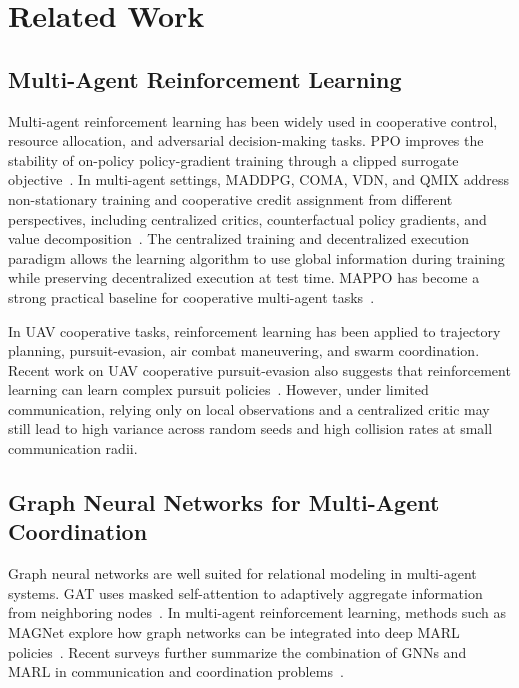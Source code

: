 \section{Related Work}

\subsection{Multi-Agent Reinforcement Learning}

Multi-agent reinforcement learning has been widely used in cooperative control, resource allocation, and adversarial decision-making tasks. PPO improves the stability of on-policy policy-gradient training through a clipped surrogate objective~\cite{schulman2017ppo}. In multi-agent settings, MADDPG, COMA, VDN, and QMIX address non-stationary training and cooperative credit assignment from different perspectives, including centralized critics, counterfactual policy gradients, and value decomposition~\cite{lowe2017maddpg,foerster2018coma,sunehag2018vdn,rashid2018qmix}. The centralized training and decentralized execution paradigm allows the learning algorithm to use global information during training while preserving decentralized execution at test time. MAPPO has become a strong practical baseline for cooperative multi-agent tasks~\cite{yu2021mappo}.

In UAV cooperative tasks, reinforcement learning has been applied to trajectory planning, pursuit-evasion, air combat maneuvering, and swarm coordination. Recent work on UAV cooperative pursuit-evasion also suggests that reinforcement learning can learn complex pursuit policies~\cite{zhao2024uav_pursuit_evasion}. However, under limited communication, relying only on local observations and a centralized critic may still lead to high variance across random seeds and high collision rates at small communication radii.

\subsection{Graph Neural Networks for Multi-Agent Coordination}

Graph neural networks are well suited for relational modeling in multi-agent systems. GAT uses masked self-attention to adaptively aggregate information from neighboring nodes~\cite{velickovic2017gat}. In multi-agent reinforcement learning, methods such as MAGNet explore how graph networks can be integrated into deep MARL policies~\cite{malysheva2020magnet}. Recent surveys further summarize the combination of GNNs and MARL in communication and coordination problems~\cite{liu2024gnn_marl,cuzin2026gnn_comm_survey}.

